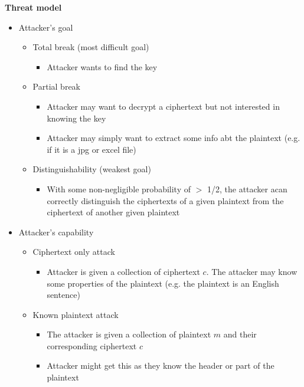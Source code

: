 \documentclass[landscape,a4paper]{extarticle}
\begin{document}
\begin{multicols*}{5}
    \textbf{Threat model}
    \begin{itemize}
        \item Attacker's goal
        \begin{itemize}
            \item Total break (most difficult goal)
            \begin{itemize}
                \item Attacker wants to find the key
            \end{itemize}
            \item Partial break
            \begin{itemize}
                \item Attacker may want to decrypt a ciphertext but not interested in knowing the key
                \item Attacker may simply want to extract some info abt the plaintext (e.g. if it is a jpg or excel file)
            \end{itemize}
            \item Distinguishability (weakest goal)
            \begin{itemize}
                \item With some non-negligible probability of $>$ 1/2, the attacker acan correctly
                distinguish the ciphertexts of a given plaintext from the ciphertext of another given
                plaintext 
            \end{itemize}
        \end{itemize}
        \item Attacker's capability
        \begin{itemize}
            \item Ciphertext only attack
            \begin{itemize}
                \item Attacker is given a collection of ciphertext $c$. The attacker may 
                know some properties of the plaintext (e.g. the plaintext is an English sentence)
            \end{itemize}
            \item Known plaintext attack
            \begin{itemize}
                \item The attacker is given a collection of plaintext $m$ and their corresponding
                ciphertext $c$
                \item Attacker might get this as they know the header or part of the plaintext

\end{itemize}
\end{itemize}
\end{itemize}
\end{multicols*}
\end{document}
